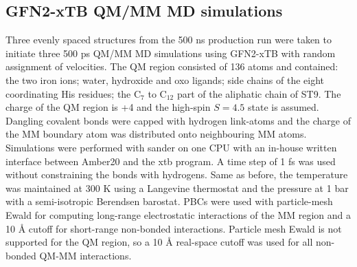 \subsection{GFN2-xTB QM/MM MD simulations}
Three evenly spaced structures from the 500 ns production run were taken to initiate three 500 ps QM/MM MD simulations using GFN2-xTB with random assignment of velocities. The QM region consisted of 136 atoms and contained: the two iron ions; water, hydroxide and oxo ligands; side chains of the eight coordinating His residues; the C$_7$ to C$_{12}$ part of the aliphatic chain of ST9. The charge of the QM region is +4 and the high-spin $S=4.5$ state is assumed. Dangling covalent bonds were capped with hydrogen link-atoms and the charge of the MM boundary atom was distributed onto neighbouring MM atoms. Simulations were performed with sander on one CPU with an in-house written interface between Amber20 and the xtb program. A time step of 1 fs was used without constraining the bonds with hydrogens. Same as before, the temperature was maintained at 300 K using a Langevine thermostat and the pressure at 1 bar with a semi-isotropic Berendsen barostat. PBCs were used with particle-mesh Ewald for computing long-range electrostatic interactions of the MM region and a 10 Å cutoff for short-range non-bonded interactions. Particle mesh Ewald is not supported for the QM region, so a 10 Å real-space cutoff was used for all non-bonded QM-MM interactions.

